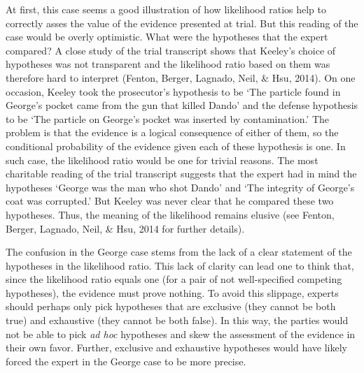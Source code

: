 \documentclass[
  10pt,
  dvipsnames,enabledeprecatedfontcommands]{scrartcl}
\begin{document}
At first, this case seems a good illustration of how likelihood ratios
help to correctly asses the value of the evidence presented at trial.
But this reading of the case would be overly optimistic. What were the
hypotheses that the expert compared? A close study of the trial
transcript shows that Keeley's choice of hypotheses was not transparent
and the likelihood ratio based on them was therefore hard to interpret
(Fenton, Berger, Lagnado, Neil, \& Hsu, 2014). On one occasion, Keeley
took the prosecutor's hypothesis to be `The particle found in George's
pocket came from the gun that killed Dando' and the defense hypothesis
to be `The particle on George's pocket was inserted by contamination.'
The problem is that the evidence is a logical consequence of either of
them, so the conditional probability of the evidence given each of these
hypothesis is one. In such case, the likelihood ratio would be one for
trivial reasons. The most charitable reading of the trial transcript
suggests that the expert had in mind the hypotheses `George was the man
who shot Dando' and `The integrity of George's coat was corrupted.' But
Keeley was never clear that he compared these two hypotheses. Thus, the
meaning of the likelihood remains elusive (see Fenton, Berger, Lagnado,
Neil, \& Hsu, 2014 for further details).

The confusion in the George case stems from the lack of a clear
statement of the hypotheses in the likelihood ratio. This lack of
clarity can lead one to think that, since the likelihood ratio equals
one (for a pair of not well-specified competing hypotheses), the
evidence must prove nothing. To avoid this slippage, experts should
perhaps only pick hypotheses that are exclusive (they cannot be both
true) and exhaustive (they cannot be both false). In this way, the
parties would not be able to pick \textit{ad hoc} hypotheses and skew
the assessment of the evidence in their own favor. Further, exclusive
and exhaustive hypotheses would have likely forced the expert in the
George case to be more precise.
\end{document}
